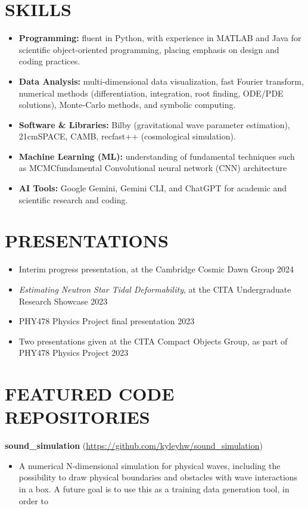 \documentclass[a4paper,10pt]{extarticle}
\begin{document}
\section*{SKILLS}
\begin{itemize}
    \item \textbf{Programming:} fluent in Python, with experience in MATLAB and Java for scientific object-oriented programming, placing emphasis on design and coding practices.
    \item \textbf{Data Analysis:} multi-dimensional data visualization, fast Fourier transform, numerical methods (differentiation, integration, root finding, ODE/PDE solutions), Monte-Carlo methods, and symbolic computing.
    \item \textbf{Software \& Libraries:} Bilby (gravitational wave parameter estimation), 21cmSPACE, CAMB, recfast++ (cosmological simulation).
    \item \textbf{Machine Learning (ML):} understanding of fundamental techniques such as MCMCfundamental Convolutional neural network (CNN) architecture
    \item \textbf{AI Tools:} Google Gemini, Gemini CLI, and ChatGPT for academic and scientific research and coding.
\end{itemize}

\section*{PRESENTATIONS}
\begin{itemize}
    \item Interim progress presentation, at the Cambridge Cosmic Dawn Group \hfill 2024

    \item \textit{Estimating Neutron Star Tidal Deformability}, at the CITA Undergraduate Research Showcase \hfill 2023

    \item PHY478 Physics Project final presentation \hfill 2023

    \item Two presentations given at the CITA Compact Objects Group, as part of PHY478 Physics Project \hfill 2023
\end{itemize}

\section*{FEATURED CODE REPOSITORIES}
\textbf{sound\_simulation} (\url{https://github.com/kyleyhw/sound_simulation})
\begin{itemize}
    \item A numerical N-dimensional simulation for physical waves, including the possibility to draw physical boundaries and obstacles with wave interactions in a box. A future goal is to use this as a training data generation tool, in order to 
\end{itemize}
\end{document}
